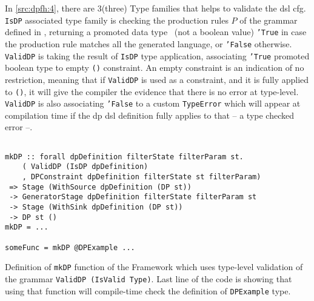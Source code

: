 In \autoref{src:dpfh:4}, there are 3(three) Type families that helps to validate the \acrshort{dsl} \acrshort{cfg}. 
\texttt{IsDP} associated type family is checking the production rules $P$ of the grammar defined in , returning a promoted data type~\cite{promoted-types} (not a boolean value) \texttt{'True} in case
the production rule matches all the generated language, or \texttt{'False} otherwise. 
\texttt{ValidDP} is taking the result of \texttt{IsDP} type application, associating \texttt{'True} promoted boolean type to empty \texttt{()} constraint. An empty constraint is an indication of no restriction, meaning that if \texttt{ValidDP} is used as a constraint, and it is fully applied to \texttt{()}, it will give the compiler the evidence that there is no error at type-level.
\texttt{ValidDP} is also associating \texttt{'False} to a custom \texttt{TypeError} which will appear at compilation time if the \acrshort{dp} \acrshort{dsl} definition fully applies to that -- a type checked error --.

\begin{listing}[H]
  \begin{verbatim}

mkDP :: forall dpDefinition filterState filterParam st.
    ( ValidDP (IsDP dpDefinition)
    , DPConstraint dpDefinition filterState st filterParam)
 => Stage (WithSource dpDefinition (DP st)) 
 -> GeneratorStage dpDefinition filterState filterParam st  
 -> Stage (WithSink dpDefinition (DP st))  
 -> DP st ()
mkDP = ...

someFunc = mkDP @DPExample ...

  \end{verbatim}
  \caption[{[\texttt{Stage.hs}] Using validation of \acrshort{dp} encoded in $G_{dsl}$}]{Definition of \texttt{mkDP} function of the Framework which uses type-level validation of the grammar \texttt{ValidDP (IsValid Type)}. Last line of the code is showing that using that function will compile-time check the definition of \texttt{DPExample} type.}
  \label{src:dpfh:5}
\end{listing}

